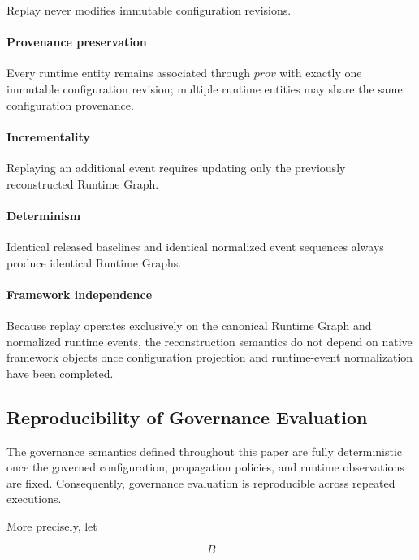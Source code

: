 \documentclass[10pt]{article}
\begin{document}
Replay never modifies immutable configuration revisions.

\paragraph*{Provenance preservation}


Every runtime entity remains associated through $prov$ with exactly one
immutable configuration revision; multiple runtime entities may share the same
configuration provenance.

\paragraph*{Incrementality}

Replaying an additional event requires updating only the previously
reconstructed Runtime Graph.

\paragraph*{Determinism}

Identical released baselines and identical normalized event sequences always produce identical Runtime Graphs.

\paragraph*{Framework independence}

Because replay operates exclusively on the canonical Runtime Graph and
normalized runtime events, the reconstruction semantics do not depend on native
framework objects once configuration projection and runtime-event normalization
have been completed.

\subsection{Reproducibility of Governance Evaluation}
\label{appendix:governance_reproducibility}

The governance semantics defined throughout this paper are fully deterministic once the governed configuration, propagation policies, and runtime observations are fixed. Consequently, governance evaluation is reproducible across repeated
executions.

More precisely, let

\[
B
\]
\end{document}
